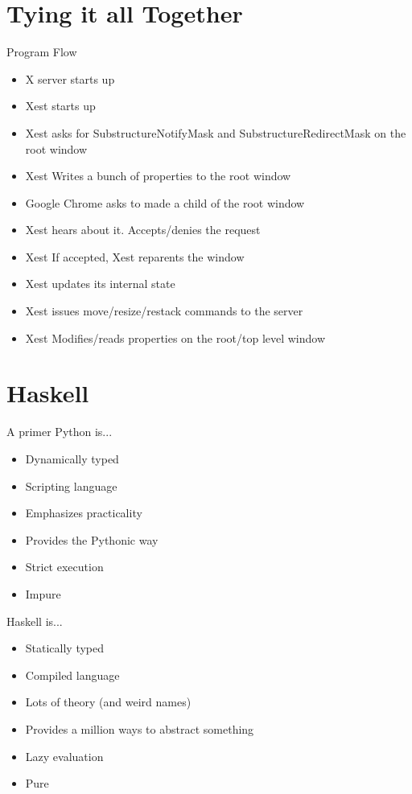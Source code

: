 \documentclass[10pt]{beamer}
\begin{document}
\section{Tying it all Together}
\begin{frame}{Program Flow}
  \begin{itemize}
    \item X server starts up
    \item Xest starts up
    \item Xest asks for SubstructureNotifyMask and SubstructureRedirectMask on
      the root window
    \item Xest Writes a bunch of properties to the root window
    \item Google Chrome asks to made a child of the root window
    \item Xest hears about it. Accepts/denies the request
    \item Xest If accepted, Xest reparents the window
    \item Xest updates its internal state
    \item Xest issues move/resize/restack commands to the server
    \item Xest Modifies/reads properties on the root/top level window
  \end{itemize}
\end{frame}

\section{Haskell}
\begin{frame}{A primer}
  Python is...
  \begin{itemize}
    \item Dynamically typed
    \item Scripting language
    \item Emphasizes practicality
    \item Provides the Pythonic way
    \item Strict execution
    \item Impure
  \end{itemize}
  Haskell is...
  \begin{itemize}
    \item Statically typed
    \item Compiled language
    \item Lots of theory (and weird names)
    \item Provides a million ways to abstract something
    \item Lazy evaluation
    \item Pure
  \end{itemize}
\end{frame}
\end{document}
